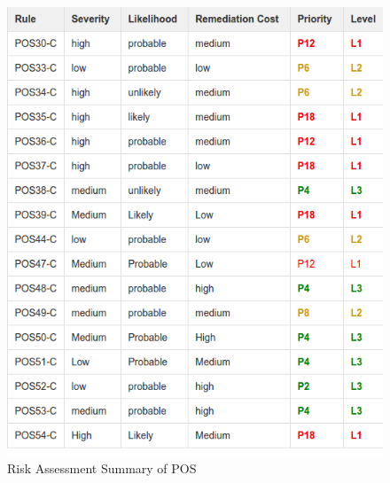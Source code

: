 	\begin{figure}[H]
		
		
		\centering
		\includegraphics[width=.6\linewidth]{Figures/pos}
		\caption{Risk Assessment Summary of POS}
		\label{16}
		
	\end{figure}
 




